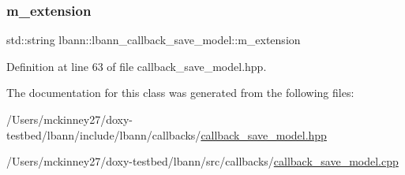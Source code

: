 \subsubsection{\texorpdfstring{m\+\_\+extension}{m\_extension}}
{\footnotesize\ttfamily std\+::string lbann\+::lbann\+\_\+callback\+\_\+save\+\_\+model\+::m\+\_\+extension\hspace{0.3cm}{\ttfamily [private]}}



Definition at line 63 of file callback\+\_\+save\+\_\+model.\+hpp.



The documentation for this class was generated from the following files\+:\begin{DoxyCompactItemize}
\item 
/\+Users/mckinney27/doxy-\/testbed/lbann/include/lbann/callbacks/\hyperlink{callback__save__model_8hpp}{callback\+\_\+save\+\_\+model.\+hpp}\item 
/\+Users/mckinney27/doxy-\/testbed/lbann/src/callbacks/\hyperlink{callback__save__model_8cpp}{callback\+\_\+save\+\_\+model.\+cpp}\end{DoxyCompactItemize}
